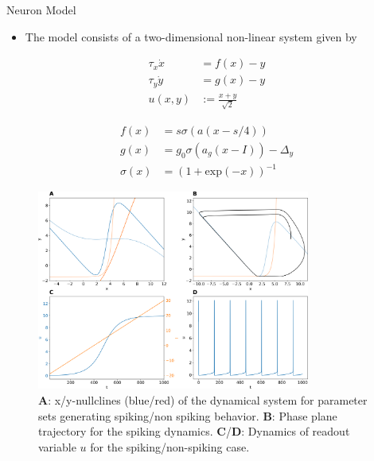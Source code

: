 \documentclass{beamer}
\begin{document}
\begin{frame}[t]
\begin{columns}
\begin{column}{.45\textwidth}
\begin{myblock}{Neuron Model}
\begin{itemize}
\item The model consists of a two-dimensional non-linear system given by
\end{itemize}
\begin{minipage}[t]{.5\linewidth}
\begin{align*}
\tau_x \dot{x} &= f(x) - y  \\ 
\tau_y \dot{y} &= g(x) - y \\
u(x,y) &:= \frac{x+y}{\sqrt{2}}
\end{align*}
\end{minipage}%
\begin{minipage}[t]{.5\linewidth}
\begin{align*}
f(x) &= s \sigma \left(a\left(x-s/4\right)\right)  \\
g(x) &= g_0 \sigma\left(a_g\left(x-I\right)\right) - \Delta_y \\
\sigma(x) &= \left(1+\mathrm{exp}(-x)\right)^{-1}
\end{align*}
\end{minipage}
\begin{figure}
\centering
\includegraphics[width=0.8\textwidth]{../figures/graphics/dynamics_combined_figure.png}
\caption{\textbf{A}: x/y-nullclines (blue/red) of the dynamical system for parameter sets generating spiking/non spiking behavior. \textbf{B}: Phase plane trajectory for the spiking dynamics. \textbf{C}/\textbf{D}: Dynamics of readout variable $u$ for the spiking/non-spiking case.}
\label{fig:dynamics_illustr}
\end{figure}
\end{myblock}


\end{column}
\end{columns}
\end{frame}
\end{document}
